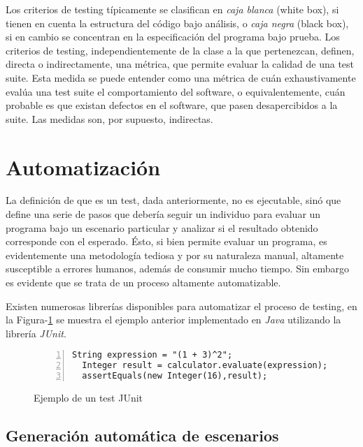 Los criterios de testing t\'ipicamente se clasifican en \emph{caja blanca} (white box), si tienen en cuenta la estructura del c\'odigo bajo an\'alisis, o \emph{caja negra} (black box), si en cambio se concentran en la especificaci\'on del programa bajo prueba. Los criterios de testing, independientemente de la clase a la que pertenezcan, definen, directa o indirectamente, una m\'etrica, que permite evaluar la calidad de una test suite. Esta medida se puede entender como una m\'etrica de cu\'an exhaustivamente eval\'ua una test suite el comportamiento del software, o equivalentemente, cu\'an probable es que existan defectos en el software, que pasen desapercibidos a la suite. Las medidas son, por supuesto, indirectas. 

\section{Automatizaci\'on}
\label{sec:preliminares.testing.automation}

La definici\'on de que es un test, dada anteriormente, no es ejecutable, sin\'o que define una serie de pasos que deber\'ia seguir un individuo para evaluar un programa bajo un escenario particular y analizar si el resultado obtenido corresponde con el esperado. \'Esto, si bien permite evaluar un programa, es evidentemente una metodolog\'ia tediosa y por su naturaleza manual, altamente susceptible a errores humanos, adem\'as de consumir mucho tiempo. Sin embargo es evidente que se trata de un proceso altamente automatizable.

Existen numerosas librer\'ias disponibles para automatizar el proceso de testing, en la Figura-\ref{figures.examples.test.junit} se muestra el ejemplo anterior implementado en \emph{Java} utilizando la librer\'ia \emph{JUnit}.

\begin{figure}
	\begin{lstlisting}[frame=single, mathescape=true,numbers=left,framexleftmargin=1.5em]
  String expression = "(1 + 3)^2";
  Integer result = calculator.evaluate(expression);
  assertEquals(new Integer(16),result);
	\end{lstlisting}
	\caption{Ejemplo de un test JUnit}
	\label{figures.examples.test.junit}
\end{figure}

\subsection{Generaci\'on autom\'atica de escenarios}

